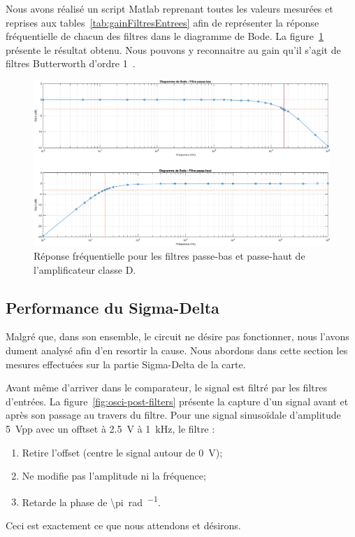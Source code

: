 \documentclass[10pt, oneside, a4paper]{article}
\begin{document}
Nous avons réalisé un script Matlab\textregistered{} reprenant toutes les valeurs mesurées et reprises aux tables~\ref{tab:gainFiltresEntrees} afin de représenter la réponse fréquentielle de chacun des filtres dans le diagramme de Bode.
La figure~\ref{fig:resultatRepFreq} présente le résultat obtenu.
Nous pouvons y reconnaitre au gain qu'il s'agit de filtres Butterworth d'ordre 1~\cite{Horowitz:2015aa}.
\begin{figure}[!ht]
    \centering
    \includegraphics[width=\textwidth]{eps/bode-filtres.eps}
    \caption{Réponse fréquentielle pour les filtres passe-bas
             et passe-haut de l'amplificateur classe D.}
    \label{fig:resultatRepFreq}
\end{figure}

\subsection{Performance du Sigma-Delta}
Malgré que, dans son ensemble, le circuit ne désire pas fonctionner, nous l'avons dument analysé afin d'en resortir la cause.
Nous abordons dans cette section les mesures effectuées sur la partie Sigma-Delta de la carte.

Avant même d'arriver dans le comparateur, le signal est filtré par les filtres d'entrées.
La figure~\ref{fig:osci-post-filters} présente la capture d'un signal avant et après son passage au travers du filtre.
Pour une signal sinusoïdale d'amplitude \SI{5}{\volt}pp avec un offtset à \SI{2.5}{\volt} à \SI{1}{\kilo\hertz}, le filtre :
\begin{enumerate}
	\item Retire l'offset (centre le signal autour de \SI{0}{\volt});
	\item Ne modifie pas l'amplitude ni la fréquence;
	\item Retarde la phase de \SI{\pi}{\radian\per\sec}.
\end{enumerate}
Ceci est exactement ce que nous attendons et désirons.
\end{document}
